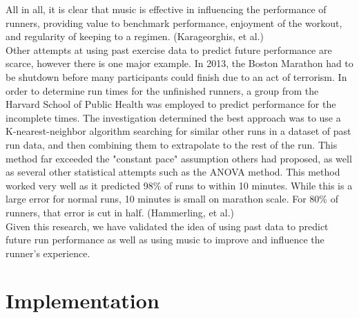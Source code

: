 \documentclass[twoside]{article}
\begin{document}
\begin{multicols}{2}
	All in all, it is clear that music is effective in influencing the performance of runners, providing value to benchmark performance, enjoyment of the workout, and regularity of keeping to a regimen. (Karageorghis, et al.)\\
	
	Other attempts at using past exercise data to predict future performance are scarce, however there is one major example. In 2013, the Boston Marathon had to be shutdown before many participants could finish due to an act of terrorism. In order to determine run times for the unfinished runners, a group from the Harvard School of Public Health was employed to predict performance for the incomplete times. The investigation determined the best approach was to use a K-nearest-neighbor algorithm searching for similar other runs in a dataset of past run data, and then combining them to extrapolate to the rest of the run. This method far exceeded the "constant pace" assumption others had proposed, as well as several other statistical attempts such as the ANOVA method. This method worked very well as it predicted 98\% of runs to within 10 minutes. While this is a large error for normal runs, 10 minutes is small on marathon scale. For 80\% of runners, that error is cut in half. (Hammerling, et al.)\\
	
	Given this research, we have validated the idea of using past data to predict future run performance as well as using music to improve and influence the runner's experience. \\


\section{Implementation}


\end{multicols}
\end{document}
